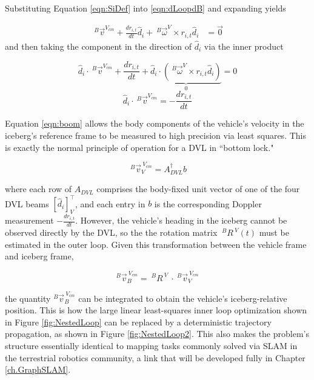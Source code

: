 Substituting Equation \ref{eqn:SiDef} into \ref{eqn:dLoopdB} and expanding yields

\begin{align} %
   ~^B\vec{v}^{V_{cm}}  + \frac{dr_{i,t}}{dt}\hat{d}_i + ~^B\vec{\omega}^V \times r_{i,t}\hat{d}_i&= \vec{0}
   \label{eqn:gettingClose}
\end{align}
and then taking the component  in the direction of $\hat{d}_i$ via the inner product

\begin{equation} %
   \hat{d}_i \cdot ~^B\vec{v}^{V_{cm}}  + \frac{dr_{i,t}}{dt} + \underbrace{ \hat{d}_i \cdot \left( ~^B\vec{\omega}^V \times r_{i,t}\hat{d}_i\right)}_{0} = 0
   \label{eqn:bodyVelocity}
   \end{equation}
   \begin{equation}
   \hat{d}_i \cdot ~^B\vec{v}^{V_{cm}} = - \frac{dr_{i,t}}{dt}
   \label{eqn:boom}
\end{equation}

Equation \ref{eqn:boom} allows the body components of the vehicle's velocity in the iceberg's reference frame to be measured to high precision via least squares. This is exactly the normal principle of operation for a DVL in ``bottom lock." 

   \begin{equation}
   ~^B\vec{v}^{~V_{cm}}_V = A_{DVL}^\dagger b
   \label{eqn:LSDVL}
\end{equation}

where each row of $A_{DVL}$ comprises the body-fixed unit vector of one of the four DVL beams $\left[\hat{d}_i\right]_V^\intercal$, and each entry in $b$ is the corresponding Doppler measurement $ -\frac{dr_{i,t}}{dt} $. However, the vehicle's heading in the iceberg cannot be observed directly by the DVL, so the the rotation matrix $~^BR^{~V}(t) $ must be estimated in the outer loop. Given this transformation between the vehicle frame and iceberg frame, 

   \begin{equation}
   ^B\vec{v}^{~V_{cm}}_B= ~^BR^{~V}~ \cdot~^B\vec{v}^{~V_{cm}}_V
   \label{eqn:boomLinAlg}
\end{equation}

the quantity $^B\vec{v}^{~V_{cm}}_B$ can be integrated to obtain the vehicle's iceberg-relative position. This is how the large linear least-squares inner loop optimization shown in Figure \ref{fig:NestedLoop} can be replaced by a deterministic trajectory propagation, as shown in Figure \ref{fig:NestedLoop2}. This also makes the problem's structure essentially identical to mapping tasks commonly solved via SLAM in the terrestrial robotics community, a link that will be developed fully in Chapter \ref{ch.GraphSLAM}.

